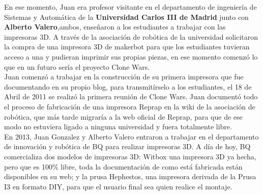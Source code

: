 En ese momento, Juan era profesor visitante en el departamento de ingeniería de Sistemas y Automática de la \textbf{Universidad Carlos III de Madrid} junto con \textbf{Alberto Valero},ambos, enseñaron a los estudiantes a trabajar con las impresoras 3D. A través de la asociación de robótica de la universidad solicitaron la compra de una impresora 3D de makerbot para que los estudiantes tuvieran acceso a una y pudieran imprimir sus propias piezas, en ese momento comenzó lo que en un futuro sería el proyecto Clone Wars.\\

Juan comenzó a trabajar en la construcción de su primera impresora que fue documentando en su propio blog, para transmitírselo a los estudiantes, el 18 de Abril de 2011 se realizó la primera reunión de Clone Wars. Juan documentó todo el proceso de fabricación de una impresora Reprap en la wiki de la asociación de robótica, que más tarde migraría a la web oficial de Reprap, para que de ese modo no estuviera ligado a ninguna universidad y fuera totalmente libre.\\

En 2013, Juan Gonzalez y Alberto Valero entraron a trabajar en el departamento de innovación y robótica de BQ para realizar impresoras 3D. A día de hoy, BQ comercializa dos modelos de impresoras 3D: Witbox una impresora 3D ya hecha, pero que es 100\% libre, toda la documentación de como está fabricada están disponibles en su web; y  la prusa Hephestos, una impresora derivada de la Prusa I3 en formato DIY, para que el usuario final sea quien realice el montaje.\\

